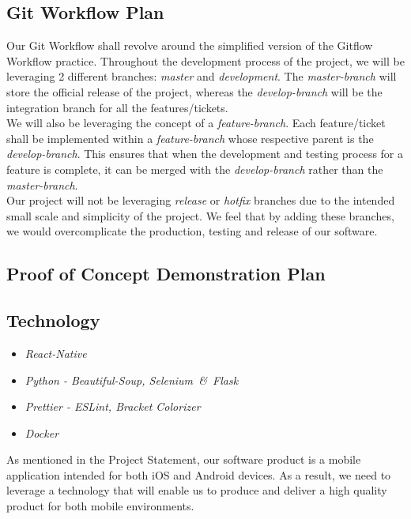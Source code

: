 \documentclass[11pt, oneside]{article}   	%
\begin{document}
\newpage
\subsection*{Git Workflow Plan}

Our Git Workflow shall revolve around the simplified version of the Gitflow Workflow practice. Throughout the development process of the project, we will be leveraging 2 different branches: {\it master} and {\it development}. The {\it master-branch} will store the official release of the project, whereas the {\it develop-branch} will be the integration branch for all the features/tickets.\\

We will also be leveraging the concept of a {\it feature-branch}. Each feature/ticket shall be implemented within a {\it feature-branch} whose respective parent is the {\it develop-branch}. This ensures that when the development and testing process for a feature is complete, it can be merged with the {\it develop-branch} rather than the {\it master-branch}.\\ 

Our project will not be leveraging {\it release} or {\it hotfix} branches due to the intended small scale and simplicity of the project. We feel that by adding these branches, we would overcomplicate the production, testing and release of our software.\\

\newpage
\subsection*{Proof of Concept Demonstration Plan}


\newpage
\subsection*{Technology}

\begin{itemize}
\item \it React-Native
\item \it Python - Beautiful-Soup, Selenium\ \&\ Flask
\item \it Prettier - ESLint, Bracket Colorizer
\item \it Docker
\end{itemize}

As mentioned in the Project Statement, our software product is a mobile application intended for both iOS and Android devices. As a result, we need to leverage a technology that will enable us to produce and deliver a high quality product for both mobile environments. \\
\end{document}
